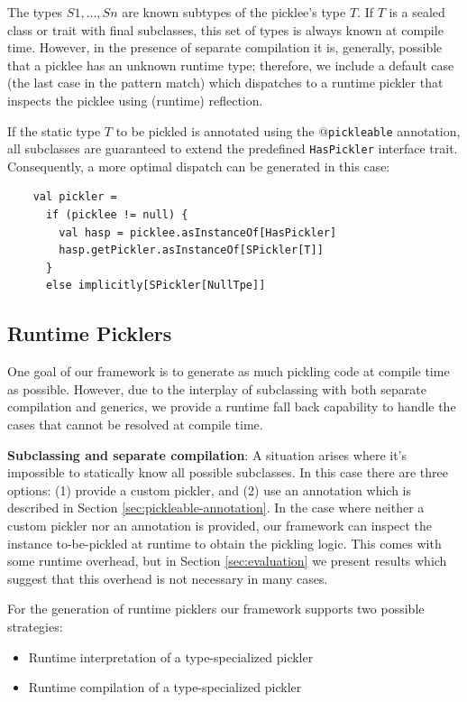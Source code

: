 \documentclass[10pt]{sigplanconf}
\theoremstyle{definition}
\theoremstyle{definition}
\newcommand{\term}[1]{\mbox{\texttt{#1}}}
\begin{document}
The types $S1, \dots, Sn$ are known subtypes of the picklee's type $T$. If $T$
is a sealed class or trait with final subclasses, this set of types is always
known at compile time. However, in the presence of separate compilation it is,
generally, possible that a picklee has an unknown runtime type; therefore, we
include a default case (the last case in the pattern match) which dispatches
to a runtime pickler that inspects the picklee using (runtime) reflection.

If the static type $T$ to be pickled is annotated using the
\term{$@$pickleable} annotation, all subclasses are guaranteed to extend the
predefined \verb|HasPickler| interface trait. Consequently, a more optimal
dispatch can be generated in this case:

\begin{lstlisting}
    val pickler =
      if (picklee != null) {
        val hasp = picklee.asInstanceOf[HasPickler]
        hasp.getPickler.asInstanceOf[SPickler[T]]
      }
      else implicitly[SPickler[NullTpe]]
\end{lstlisting}

\subsection{Runtime Picklers}
\label{sec:runtime-pickler}

One goal of our framework is to generate as much pickling code at compile time
as possible. However, due to the interplay of subclassing with both separate
compilation and generics, we provide a runtime fall back capability to handle
the cases that cannot be resolved at compile time.

{\bf Subclassing and separate compilation}: A situation arises where it's
impossible to statically know all possible subclasses. In this case there are
three options: (1) provide a custom pickler, and (2) use an annotation which
is described in Section \ref{sec:pickleable-annotation}. In the case where
neither a custom pickler nor an annotation is provided, our framework can
inspect the instance to-be-pickled at runtime to obtain the pickling logic.
This comes with some runtime overhead, but in Section \ref{sec:evaluation} we
present results which suggest that this overhead is not necessary in many
cases.

For the generation of runtime picklers our framework supports two possible
strategies:

\begin{itemize}
\item Runtime interpretation of a type-specialized pickler
\item Runtime compilation of a type-specialized pickler
\end{itemize}
\end{document}
